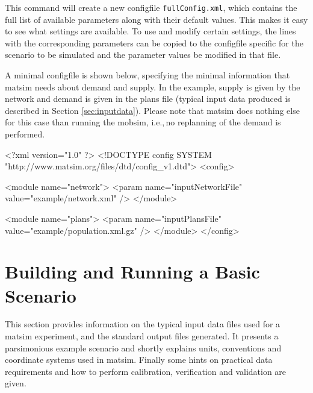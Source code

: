 This command will create a new \gls{configfile} \lstinline|fullConfig.xml|, which contains the full list of available parameters along with their default values. This makes it easy to see what settings are available. To use and modify certain settings, the lines with the corresponding parameters can be copied to the \gls{configfile} specific for the \gls{scenario} to be simulated and the parameter values be modified in that file. 

A minimal \gls{configfile} is shown below, specifying the minimal information that \gls{matsim} needs about demand and supply. In the example, supply is given by the network and demand is given in the plans file (typical input data produced is described in Section \ref{sec:inputdata}). Please note that \gls{matsim} does nothing else for this case than running the \gls{mobsim}, i.e.,\,no \gls{replanning} of the demand is performed.

\begin{xml}
<?xml version="1.0" ?> 
<!DOCTYPE config SYSTEM "http://www.matsim.org/files/dtd/config_v1.dtd"> 
<config> 
 
   <module name="network"> 
      <param name="inputNetworkFile" value="example/network.xml" /> 
   </module> 
 
   <module name="plans"> 
      <param name="inputPlansFile" value="example/population.xml.gz" /> 
   </module> 
</config>
\end{xml}

\section{Building and Running a Basic Scenario}
\label{sec:buildingbasicscenario}
This section provides information on the typical input data files used for a \gls{matsim} experiment, and the standard output files generated. It presents a parsimonious example scenario and shortly explains units, conventions and coordinate systems used in \gls{matsim}. Finally some hints on practical data requirements and how to perform calibration, verification and validation are given.

